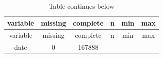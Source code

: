 \documentclass[]{book}
\theoremstyle{definition}
\theoremstyle{definition}
\theoremstyle{definition}
\theoremstyle{remark}
\begin{document}
\begin{longtable}[]{@{}cccccc@{}}
\caption{Table continues below}\tabularnewline
\toprule
\begin{minipage}[b]{0.15\columnwidth}\centering\strut
variable\strut
\end{minipage} & \begin{minipage}[b]{0.12\columnwidth}\centering\strut
missing\strut
\end{minipage} & \begin{minipage}[b]{0.13\columnwidth}\centering\strut
complete\strut
\end{minipage} & \begin{minipage}[b]{0.10\columnwidth}\centering\strut
n\strut
\end{minipage} & \begin{minipage}[b]{0.15\columnwidth}\centering\strut
min\strut
\end{minipage} & \begin{minipage}[b]{0.15\columnwidth}\centering\strut
max\strut
\end{minipage}\tabularnewline
\midrule
\endfirsthead
\toprule
\begin{minipage}[b]{0.15\columnwidth}\centering\strut
variable\strut
\end{minipage} & \begin{minipage}[b]{0.12\columnwidth}\centering\strut
missing\strut
\end{minipage} & \begin{minipage}[b]{0.13\columnwidth}\centering\strut
complete\strut
\end{minipage} & \begin{minipage}[b]{0.10\columnwidth}\centering\strut
n\strut
\end{minipage} & \begin{minipage}[b]{0.15\columnwidth}\centering\strut
min\strut
\end{minipage} & \begin{minipage}[b]{0.15\columnwidth}\centering\strut
max\strut
\end{minipage}\tabularnewline
\midrule
\endhead
\begin{minipage}[t]{0.15\columnwidth}\centering\strut
date\strut
\end{minipage} & \begin{minipage}[t]{0.12\columnwidth}\centering\strut
0\strut
\end{minipage} & \begin{minipage}[t]{0.13\columnwidth}\centering\strut
167888\strut
\end{minipage} & \begin{minipage}[t]{0.10\columnwidth}\centering\strut

\end{minipage}
\end{longtable}
\end{document}

